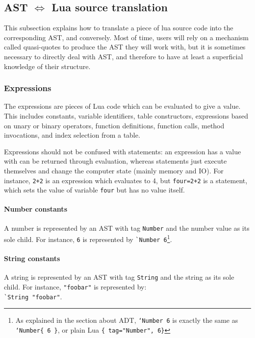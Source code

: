 \subsection{AST  $\Longleftrightarrow$ Lua source translation}

This subsection explains how to translate a piece of lua source code
into the corresponding AST, and conversely. Most of time, users will
rely on a mechanism called quasi-quotes to produce the AST they will
work with, but it is sometimes necessary to directly deal with AST,
and therefore to have at least a superficial knowledge of their
structure.

\subsubsection{Expressions}

The expressions are pieces of Lua code which can be evaluated to give a
value. This includes constants, variable identifiers, table
constructors, expressions based on unary or binary operators, function
definitions, function calls, method invocations, and index selection
from a table.

Expressions should not be confused with statements: an expression has
a value with can be returned through evaluation, whereas statements
just execute themselves and change the computer state (mainly memory
and IO). For instance, \verb|2+2| is an expression which evaluates to
4, but \verb|four=2+2| is a statement, which sets the value of
variable \verb|four| but has no value itself.

\paragraph{Number constants}
A number is represented by an AST with tag \verb+Number+ and the
number value as its sole child. For instance, \verb+6+ is represented
by \verb+`Number 6+\footnote{As explained in the section about ADT,
  {\tt `Number 6} is exactly the same as {\tt `Number\{ 6 \}}, or
  plain Lua {\tt\{ tag="Number", 6\}} }.

\paragraph{String constants}
A string is represented by an AST with tag \verb+String+ and the
string as its sole child. For instance, \verb+"foobar"+ is
represented by:\\
\verb+`String "foobar"+.

